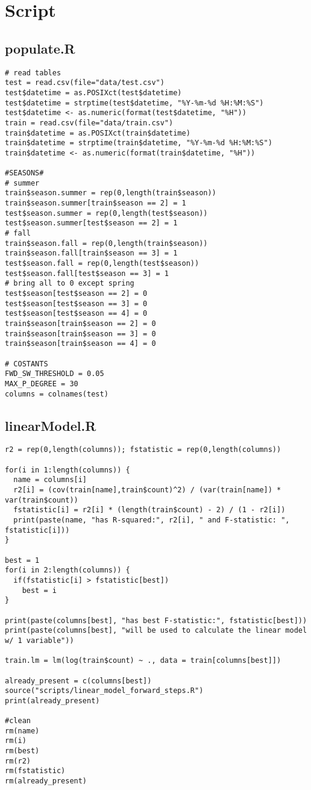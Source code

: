 \section{Script}\label{sec:script}

\subsection{populate.R}\label{sec:script-populate}
\begin{verbatim}
# read tables
test = read.csv(file="data/test.csv")
test$datetime = as.POSIXct(test$datetime)
test$datetime = strptime(test$datetime, "%Y-%m-%d %H:%M:%S")
test$datetime <- as.numeric(format(test$datetime, "%H"))
train = read.csv(file="data/train.csv")
train$datetime = as.POSIXct(train$datetime)
train$datetime = strptime(train$datetime, "%Y-%m-%d %H:%M:%S")
train$datetime <- as.numeric(format(train$datetime, "%H"))

#SEASONS#
# summer
train$season.summer = rep(0,length(train$season))
train$season.summer[train$season == 2] = 1
test$season.summer = rep(0,length(test$season))
test$season.summer[test$season == 2] = 1
# fall
train$season.fall = rep(0,length(train$season))
train$season.fall[train$season == 3] = 1
test$season.fall = rep(0,length(test$season))
test$season.fall[test$season == 3] = 1
# bring all to 0 except spring
test$season[test$season == 2] = 0
test$season[test$season == 3] = 0
test$season[test$season == 4] = 0
train$season[train$season == 2] = 0
train$season[train$season == 3] = 0
train$season[train$season == 4] = 0

# COSTANTS
FWD_SW_THRESHOLD = 0.05
MAX_P_DEGREE = 30
columns = colnames(test)
\end{verbatim}

\subsection{linearModel.R}\label{sec:script-linear-model}

\begin{verbatim}
r2 = rep(0,length(columns)); fstatistic = rep(0,length(columns))

for(i in 1:length(columns)) {
  name = columns[i]
  r2[i] = (cov(train[name],train$count)^2) / (var(train[name]) * var(train$count))
  fstatistic[i] = r2[i] * (length(train$count) - 2) / (1 - r2[i])
  print(paste(name, "has R-squared:", r2[i], " and F-statistic: ", fstatistic[i]))
}

best = 1
for(i in 2:length(columns)) {
  if(fstatistic[i] > fstatistic[best])
    best = i
}

print(paste(columns[best], "has best F-statistic:", fstatistic[best]))
print(paste(columns[best], "will be used to calculate the linear model w/ 1 variable"))

train.lm = lm(log(train$count) ~ ., data = train[columns[best]])

already_present = c(columns[best])
source("scripts/linear_model_forward_steps.R")
print(already_present)

#clean
rm(name)
rm(i)
rm(best)
rm(r2)
rm(fstatistic)
rm(already_present)
\end{verbatim}

